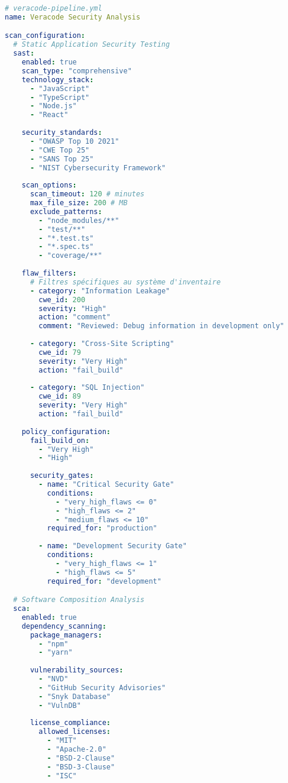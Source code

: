 \documentclass[12pt,a4paper]{report}
\begin{document}
\begin{lstlisting}[language=YAML, caption=Configuration Veracode pour analyse complète]
# veracode-pipeline.yml
name: Veracode Security Analysis

scan_configuration:
  # Static Application Security Testing
  sast:
    enabled: true
    scan_type: "comprehensive"
    technology_stack:
      - "JavaScript"
      - "TypeScript" 
      - "Node.js"
      - "React"
    
    security_standards:
      - "OWASP Top 10 2021"
      - "CWE Top 25"
      - "SANS Top 25"
      - "NIST Cybersecurity Framework"
    
    scan_options:
      scan_timeout: 120 # minutes
      max_file_size: 200 # MB
      exclude_patterns:
        - "node_modules/**"
        - "test/**"
        - "*.test.ts"
        - "*.spec.ts"
        - "coverage/**"
    
    flaw_filters:
      # Filtres spécifiques au système d'inventaire
      - category: "Information Leakage"
        cwe_id: 200
        severity: "High"
        action: "comment"
        comment: "Reviewed: Debug information in development only"
      
      - category: "Cross-Site Scripting"
        cwe_id: 79
        severity: "Very High"
        action: "fail_build"
      
      - category: "SQL Injection"
        cwe_id: 89
        severity: "Very High"
        action: "fail_build"
    
    policy_configuration:
      fail_build_on:
        - "Very High"
        - "High"
      
      security_gates:
        - name: "Critical Security Gate"
          conditions:
            - "very_high_flaws <= 0"
            - "high_flaws <= 2"
            - "medium_flaws <= 10"
          required_for: "production"
        
        - name: "Development Security Gate"
          conditions:
            - "very_high_flaws <= 1"
            - "high_flaws <= 5"
          required_for: "development"

  # Software Composition Analysis
  sca:
    enabled: true
    dependency_scanning:
      package_managers:
        - "npm"
        - "yarn"
      
      vulnerability_sources:
        - "NVD"
        - "GitHub Security Advisories"
        - "Snyk Database"
        - "VulnDB"
      
      license_compliance:
        allowed_licenses:
          - "MIT"
          - "Apache-2.0"
          - "BSD-2-Clause"
          - "BSD-3-Clause"
          - "ISC"
        

\end{lstlisting}
\end{document}
